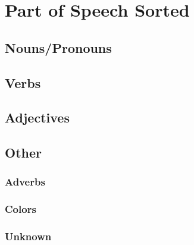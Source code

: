 \chapter{Part of Speech Sorted}

\section{Nouns/Pronouns}

\section{Verbs}

\section{Adjectives}

\section{Other}

\subsection{Adverbs}

\subsection{Colors}

\subsection{Unknown}

